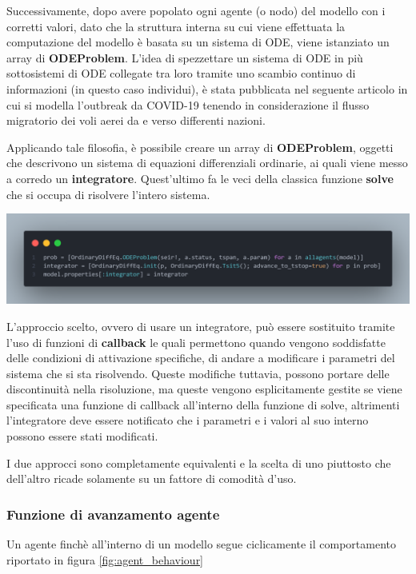 Successivamente, dopo avere popolato ogni agente (o nodo) del modello con i corretti valori,
dato che la struttura interna su cui viene effettuata la computazione del modello è basata su 
un sistema di ODE, viene istanziato un array di \textbf{ODEProblem}. L'idea di spezzettare
un sistema di ODE in più sottosistemi di ODE collegate tra loro tramite uno scambio continuo 
di informazioni (in questo caso individui), è stata pubblicata nel seguente articolo \cite{Ding2021}
in cui si modella l'outbreak da COVID-19 tenendo in considerazione il flusso migratorio 
dei voli aerei da e verso differenti nazioni. 

Applicando tale filosofia, è possibile creare un array di \textbf{ODEProblem}, oggetti che descrivono
un sistema di equazioni differenziali ordinarie, ai quali viene messo a corredo un \textbf{integratore}. 
Quest'ultimo fa le veci della classica funzione \textbf{solve} che si occupa di risolvere l'intero sistema.

\begin{minipage}{\linewidth}
	\centering
	\includegraphics[width=\textwidth]{img/model_ode.png}
	\label{fig:model_ode}
\end{minipage}

L'approccio scelto, ovvero di usare un integratore, può essere sostituito tramite
l'uso di funzioni di \textbf{callback} le quali permettono quando vengono soddisfatte delle
condizioni di attivazione specifiche, di andare a modificare i parametri del sistema che
si sta risolvendo. Queste modifiche tuttavia, possono portare delle discontinuità nella 
risoluzione, ma queste vengono esplicitamente gestite se viene specificata una funzione 
di callback all'interno della funzione di solve, altrimenti l'integratore deve essere notificato che 
i parametri e i valori al suo interno possono essere stati modificati. 

I due approcci sono completamente equivalenti e la scelta di uno piuttosto che dell'altro
ricade solamente su un fattore di comodità d'uso.

\subsubsection{Funzione di avanzamento agente}
Un agente finchè all'interno di un modello segue ciclicamente il comportamento
riportato in figura \ref{fig:agent_behaviour}

